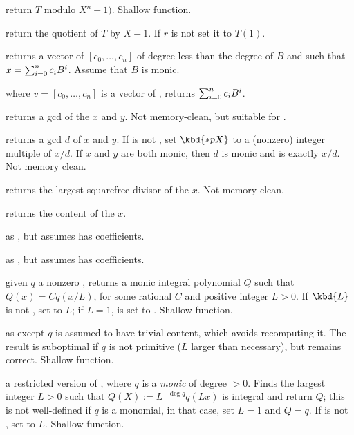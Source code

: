  return $T$ modulo $X^n - 1)$. Shallow
function.

 return the quotient of $T$ by $X-1$.
If $r$ is not  set it to $T(1)$.

 returns a vector of 
$[c_0,\ldots,c_n]$ of degree less than the degree of $B$ and such that
$x=\sum_{i=0}^{n}{c_i\*B^i}$. Assume that $B$ is monic.

 where $v=[c_0,\ldots,c_n]$
is a vector of , returns $\sum_{i=0}^{n}{c_i\*B^i}$.

 returns a gcd of the  $x$ and $y$.
Not memory-clean, but suitable for .

 returns a gcd $d$ of $x$ and
$y$. If  is not , set $\kbd{*pX}$ to a (nonzero) integer
multiple of $x/d$. If $x$ and $y$ are both monic, then $d$ is monic and
 is exactly $x/d$. Not memory clean.

 returns the largest squarefree divisor
of the  $x$. Not memory clean.

 returns the content of the  $x$.

 as , but assumes  has 
coefficients.

 as , but assumes
 has  coefficients.

 given $q$ a nonzero ,
returns a monic integral polynomial $Q$ such that $Q(x) = C q(x/L)$, for some
rational $C$ and positive integer $L > 0$. If $\kbd{L}$ is not ,
set  to $L$; if $L = 1$,  is set to . Shallow
function.

 as  except
$q$ is assumed to have trivial content, which avoids recomputing it.
The result is suboptimal if $q$ is not primitive ($L$ larger than
necessary), but remains correct. Shallow function.

 a restricted version of
, where $q$ is a \emph{monic} 
of degree $> 0$. Finds the largest integer $L > 0$ such that
$Q(X) := L^{-\deg q} q(Lx)$ is integral and return $Q$; this is not
well-defined if $q$ is a monomial, in that case, set $L=1$ and $Q = q$. If
 is not , set  to $L$. Shallow function.


